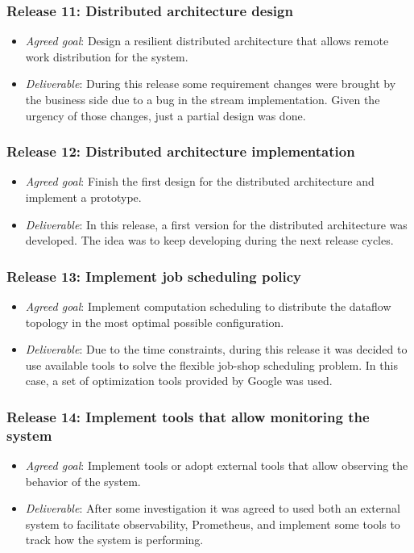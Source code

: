 \subsubsection{Release 11: Distributed architecture design}
\begin{itemize}
\item \textit{Agreed goal}: Design a resilient distributed architecture that
  allows remote work distribution for the system.
\item \textit{Deliverable}: During this release some requirement changes were brought
  by the business side due to a bug in the stream implementation. Given the urgency
  of those changes, just a partial design was done.
\end{itemize}

\subsubsection{Release 12: Distributed architecture implementation}
\begin{itemize}
\item \textit{Agreed goal}: Finish the first design for the distributed
  architecture and implement a prototype.
\item \textit{Deliverable}: In this release, a first version for the distributed
  architecture was developed. The idea was to keep developing during the next
  release cycles.
\end{itemize}

\subsubsection{Release 13: Implement job scheduling policy}
\begin{itemize}
\item \textit{Agreed goal}: Implement computation scheduling to distribute the
  dataflow topology in the most optimal possible configuration.
\item \textit{Deliverable}: Due to the time constraints, during this release it
  was decided to use available tools to solve the flexible job-shop scheduling
  problem. In this case, a set of optimization tools provided by Google was
  used.
\end{itemize}

\subsubsection{Release 14: Implement tools that allow monitoring the system}
\begin{itemize}
\item \textit{Agreed goal}: Implement tools or adopt external tools that allow
  observing the behavior of the system.
\item \textit{Deliverable}: After some investigation it was agreed to used both
  an external system to facilitate observability, Prometheus, and implement some
  tools to track how the system is performing.
\end{itemize}

